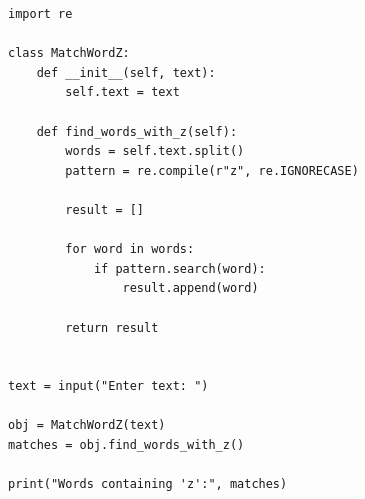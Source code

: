 \begin{verbatim}
import re

class MatchWordZ:
    def __init__(self, text):
        self.text = text

    def find_words_with_z(self):
        words = self.text.split()
        pattern = re.compile(r"z", re.IGNORECASE)

        result = []

        for word in words:
            if pattern.search(word):
                result.append(word)

        return result


text = input("Enter text: ")

obj = MatchWordZ(text)
matches = obj.find_words_with_z()

print("Words containing 'z':", matches)
\end{verbatim}